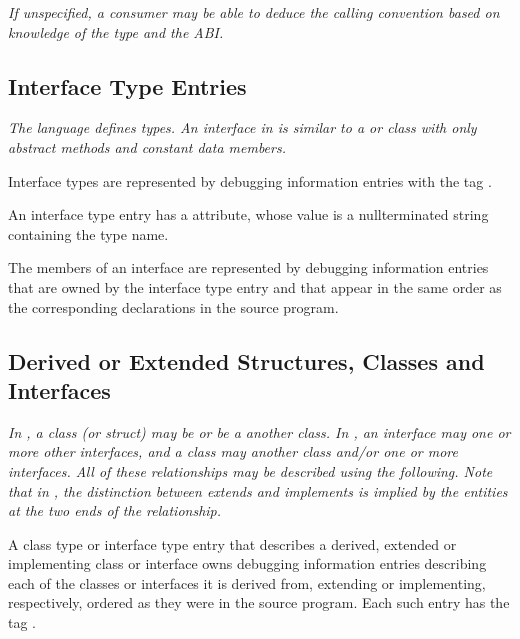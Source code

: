 \textit{If unspecified, a consumer may be able to deduce the calling
convention based on knowledge of the type and the ABI.}


\subsection{Interface Type Entries}
\label{chap:interfacetypeentries}

\textit{The  language defines  types. 
An interface
in  is similar to a  or 
 class with only abstract
methods and constant data members.}

Interface types 
are represented by debugging information
entries with the 
tag \DWTAGinterfacetypeTARG.

An interface type entry has 
a \DWATname{} attribute,
whose
value is a null\dash terminated string containing the type name.
\bbeb

The members of an interface are represented by debugging
information entries that are owned by the interface type
entry and that appear in the same order as the corresponding
declarations in the source program.

\subsection{Derived or Extended Structures, Classes and Interfaces}
\label{chap:derivedorextendedstructsclasesandinterfaces}

\textit{In , a class (or struct) 
may 
be  or be a
 another class. 
In , an interface may 
one 
or more other interfaces, and a class may  another
class and/or  one or more interfaces. All of these
relationships may be described using the following. Note that
in , 
the distinction between extends and implements is
implied by the entities at the two ends of the relationship.}

A class type or interface type entry that describes a
derived, extended or implementing class or interface owns
debugging information entries describing each of the classes
or interfaces it is derived from, extending or implementing,
respectively, ordered as they were in the source program. Each
such entry has 
the 
tag \DWTAGinheritanceTARG.

